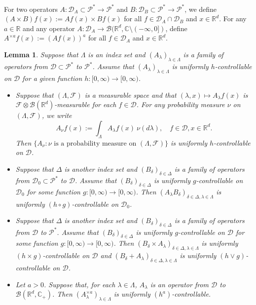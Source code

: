 \documentclass[12pt,a4paper]{amsart}
\theoremstyle{plain}
\newtheorem{lem}[thm]{Lemma}
\theoremstyle{definition}
\numberwithin{equation}{section}
\begin{document}
    For two operators $A: \mathcal D_A \subset \mathcal P^*\to \mathcal P^*$ and $B: \mathcal D_B \subset \mathcal P^*\to \mathcal P^*$, we define $(A \times B)f (x):= Af(x) \times Bf(x)$ for all $f\in \mathcal D_A \cap \mathcal D_B$ and $x\in \mathbb{R}^d$.
    For any $a \in \mathbb R$ and any operator $A :\mathcal D_A \to \mathcal B(\mathbb R^d, \mathbb C\setminus (-\infty, 0])$, define $A^{\times a}f(x):= (Af(x))^a$ for all $f\in \mathcal D_A$ and $x\in \mathbb R^d$.
\begin{lem}\label{lem: property of controllable operators}
Suppose that $\Lambda$ is an index set and $(A_\lambda)_{\lambda\in \Lambda}$ is a 
family of operators from $\mathcal D\subset \mathcal P^*$ to $ \mathcal P^*$.
    Assume that $(A_\lambda)_{\lambda\in \Lambda}$ is uniformly $h$-controllable on $\mathcal D$ for a given function $h:[0,\infty) \to [0, \infty)$.
\begin{itemize}
\item[(1)]
    Suppose that $(\Lambda, \mathscr F)$ is a measurable space and that $(\lambda,x)\mapsto A_\lambda f(x)$ is $\mathscr F \otimes \mathscr B(\mathbb R^d)$-measurable for each $f\in \mathcal D$.
    For any probability measure $\nu$ on $(\Lambda, \mathscr F)$,  we write
\[
    A_\nu f(x)
    := \int_{\Lambda} A_\lambda f (x)~\nu(d\lambda),
    \quad f\in \mathcal D, x\in \mathbb R^d.
\]
    Then  $\{A_\nu: \nu \text{ is  a probability measure on } (\Lambda, \mathscr F)\}$ is uniformly $h$-controllable on $\mathcal D$.
\item[(2)]
    Suppose that $\Delta$ is another index set and $(B_\delta)_{\delta\in \Delta}$ is a family of operators from $\mathcal D_0\subset \mathcal P^*$ to $ \mathcal D$.
    Assume that $(B_\delta)_{\delta\in \Delta}$ is uniformly $g$-controllable on $\mathcal D_0$ for some function $g: [0,\infty) \to [0,\infty)$.
    Then $(A_\lambda B_\delta)_{\delta\in \Delta, \lambda \in \Lambda}$ is uniformly $(h \circ g)$-controllable on $\mathcal D_0$.
\item[(3)]
    Suppose that $\Delta$ is another index set and $(B_\delta)_{\delta\in \Delta}$ is a family of operators from $\mathcal D$ to $ \mathcal P^*$.
    Assume that $(B_\delta)_{\delta\in \Delta}$ is uniformly $g$-controllable on $\mathcal D$ for some function $g: [0,\infty) \to [0,\infty)$.
    Then  $(B_\delta\times A_\lambda)_{\delta \in \Delta, \lambda \in \Lambda}$ is uniformly $(h\times g)$-controllable on $\mathcal D$ and $(B_\delta + A_\lambda)_{\delta \in \Delta, \lambda \in \Lambda}$ is uniformly $(h\vee g)$-controllable on $\mathcal D$.
\item[(4)]
    Let $a>0$.
    Suppose that, for each $\lambda \in \Lambda$, $A_\lambda$ is an operator from $\mathcal D$ to $\mathcal B(\mathbb R^d, \mathbb C_+)$.
    Then $(A^{\times a}_\lambda)_{\lambda \in \Lambda}$ is uniformly $(h^a)$-controllable.
\end{itemize}
\end{lem}
\end{document}
